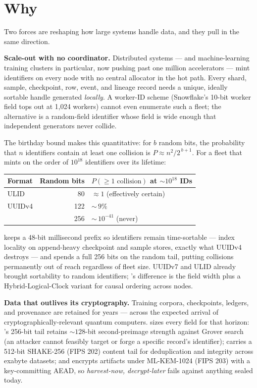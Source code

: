 \section{Why \tessera{}}
\label{sec:why}

Two forces are reshaping how large systems handle data, and they pull in the same direction.

\textbf{Scale-out with no coordinator.} Distributed systems --- and machine-learning training clusters in particular, now pushing past one million accelerators --- mint identifiers on every node with no central allocator in the hot path. Every shard, sample, checkpoint, row, event, and lineage record needs a unique, ideally sortable handle generated \emph{locally}. A worker-ID scheme (Snowflake's 10-bit worker field tops out at 1{,}024 workers) cannot even enumerate such a fleet; the alternative is a random-field identifier whose field is wide enough that independent generators never collide.

The birthday bound makes this quantitative: for $b$ random bits, the probability that $n$ identifiers contain at least one collision is $P \approx n^{2} / 2^{\,b+1}$. For a fleet that mints on the order of $10^{18}$ identifiers over its lifetime:

\begin{center}
\small
\begin{tabular}{@{}lrl@{}}
\toprule
\textbf{Format} & \textbf{Random bits} & \textbf{$P(\geq 1\text{ collision})$ at ${\sim}10^{18}$ IDs} \\
\midrule
ULID            & 80  & $\approx 1$ (effectively certain) \\
UUIDv4          & 122 & ${\sim}\,9\%$ \\
\tesseraid{}    & 256 & ${\sim}\,10^{-41}$ (never) \\
\bottomrule
\end{tabular}
\end{center}

\tesseraid{} keeps a 48-bit millisecond prefix so identifiers remain time-sortable --- index locality on append-heavy checkpoint and sample stores, exactly what UUIDv4 destroys --- and spends a full 256 bits on the random tail, putting collisions permanently out of reach regardless of fleet size. UUIDv7 and ULID already brought sortability to random identifiers; \tessera{}'s difference is the field width plus a Hybrid-Logical-Clock variant for causal ordering across nodes.

\textbf{Data that outlives its cryptography.} Training corpora, checkpoints, ledgers, and provenance are retained for years --- across the expected arrival of cryptographically-relevant quantum computers. \tessera{} sizes every field for that horizon: \tesseraid{}'s 256-bit tail retains ${\sim}128$-bit second-preimage strength against Grover search (an attacker cannot feasibly target or forge a specific record's identifier); \tesserahash{} carries a 512-bit SHAKE-256 (FIPS 202) content tail for deduplication and integrity across exabyte datasets; and \tesseraseal{} encrypts artifacts under ML-KEM-1024 (FIPS 203) with a key-committing AEAD, so \emph{harvest-now, decrypt-later} fails against anything sealed today.

